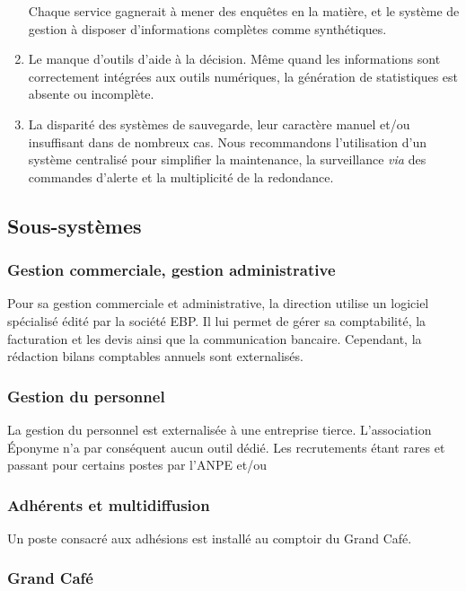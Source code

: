\begin{enumerate}
      Chaque service gagnerait à mener des enquêtes en la matière, et le système de gestion
      à disposer d'informations complètes comme synthétiques.
\item Le manque d'outils d'aide à la décision. Même quand les informations sont correctement
      intégrées aux outils numériques, la génération de statistiques est absente ou
      incomplète.
\item La disparité des systèmes de sauvegarde, leur caractère manuel et/ou insuffisant
      dans de nombreux cas.
      Nous recommandons l'utilisation d'un système centralisé pour simplifier la maintenance,
      la surveillance \textit{via} des commandes d'alerte et la multiplicité de la redondance.
\end{enumerate}


\subsection{Sous-systèmes}

\subsubsection{Gestion commerciale, gestion administrative}

Pour sa gestion commerciale et administrative, la direction utilise un logiciel spécialisé
 édité par la société EBP.
Il lui permet de gérer sa comptabilité, la facturation et les devis ainsi que la
communication bancaire. Cependant, la rédaction bilans comptables annuels sont externalisés.

\subsubsection{Gestion du personnel}

La gestion du personnel est externalisée à une entreprise tierce.
L'association Éponyme n'a par conséquent aucun outil dédié.
Les recrutements étant rares et passant pour certains postes par l'ANPE et/ou 


\subsubsection{Adhérents et multidiffusion}

Un poste consacré aux adhésions est installé au comptoir du Grand Café.

\subsubsection{Grand Café}

